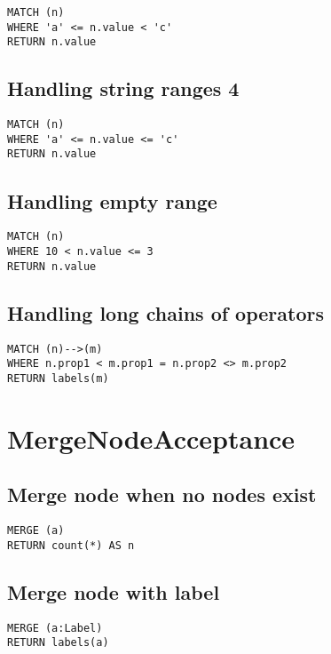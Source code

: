 \begin{lstlisting}
MATCH (n)
WHERE 'a' <= n.value < 'c'
RETURN n.value
\end{lstlisting}

\subsection{Handling string ranges 4}

\begin{lstlisting}
MATCH (n)
WHERE 'a' <= n.value <= 'c'
RETURN n.value
\end{lstlisting}

\subsection{Handling empty range}

\begin{lstlisting}
MATCH (n)
WHERE 10 < n.value <= 3
RETURN n.value
\end{lstlisting}

\subsection{Handling long chains of operators}

\begin{lstlisting}
MATCH (n)-->(m)
WHERE n.prop1 < m.prop1 = n.prop2 <> m.prop2
RETURN labels(m)
\end{lstlisting}
\section{MergeNodeAcceptance}


\subsection{Merge node when no nodes exist}

\begin{lstlisting}
MERGE (a)
RETURN count(*) AS n
\end{lstlisting}

\subsection{Merge node with label}

\begin{lstlisting}
MERGE (a:Label)
RETURN labels(a)
\end{lstlisting}

